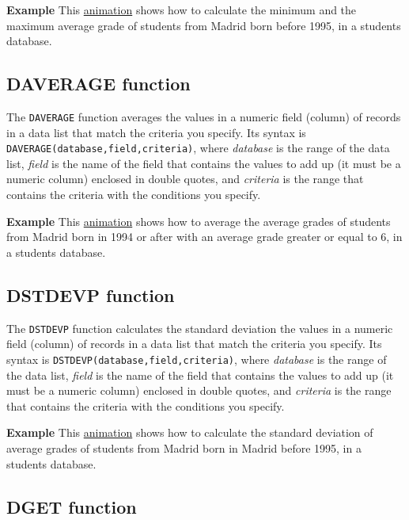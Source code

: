 \textbf{Example} This \href{http://aprendeconalf.es/office/excel/manual/img/example_function_dmin_dmax.gif}{animation} shows how to calculate the minimum and the maximum average grade of students from Madrid born before 1995, in a students database.

\subsection{DAVERAGE function}\hypertarget{daverage-function}{}\label{daverage-function}

The \texttt{DAVERAGE} function averages the values in a numeric field (column) of records in a data list that match the criteria you specify. Its syntax is \texttt{DAVERAGE(database,field,criteria)}, where \emph{database} is the range of the data list, \emph{field} is the name of the field that contains the values to add up (it must be a numeric column) enclosed in double quotes, and \emph{criteria} is the range that contains the criteria with the conditions you specify.

\textbf{Example} This \href{http://aprendeconalf.es/office/excel/manual/img/example_function_daverage.gif}{animation} shows how to average the average grades of students from Madrid born in 1994 or after with an average grade greater or equal to 6, in a students database.

\subsection{DSTDEVP function}\hypertarget{dstdevp-function}{}\label{dstdevp-function}

The \texttt{DSTDEVP} function calculates the standard deviation the values in a numeric field (column) of records in a data list that match the criteria you specify. Its syntax is \texttt{DSTDEVP(database,field,criteria)}, where \emph{database} is the range of the data list, \emph{field} is the name of the field that contains the values to add up (it must be a numeric column) enclosed in double quotes, and \emph{criteria} is the range that contains the criteria with the conditions you specify.

\textbf{Example} This \href{http://aprendeconalf.es/office/excel/manual/img/example_function_dstdevp.gif}{animation} shows how to calculate the standard deviation of average grades of students from Madrid born in Madrid before 1995, in a students database.

\subsection{DGET function}\hypertarget{dget-function}{}\label{dget-function}

